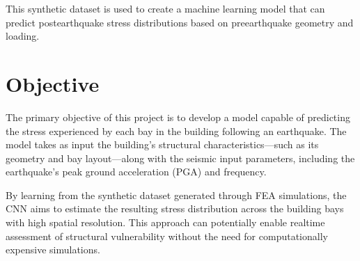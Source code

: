 \documentclass[letterpaper,10pt,english]{sphinxmanual}
\begin{document}
\sphinxAtStartPar
This synthetic dataset is used to create a machine learning model that can
predict post\sphinxhyphen{}earthquake stress distributions based on pre\sphinxhyphen{}earthquake geometry
and loading.


\section{Objective}
\label{\detokenize{index:objective}}
\sphinxAtStartPar
The primary objective of this project is to develop a 
model capable of predicting the stress experienced by each bay in the building
following an earthquake.
The model takes as input the building’s structural characteristics—such as its
geometry and bay layout—along with the seismic input parameters, including the
earthquake’s peak ground acceleration (PGA) and frequency.

\sphinxAtStartPar
By learning from the synthetic dataset generated through FEA simulations, the
CNN aims to estimate the resulting stress distribution across the building bays
with high spatial resolution.
This approach can potentially enable real\sphinxhyphen{}time assessment of structural vulnerability
without the need for computationally expensive simulations.



\renewcommand{\indexname}{Index}
\printindex
\end{document}
